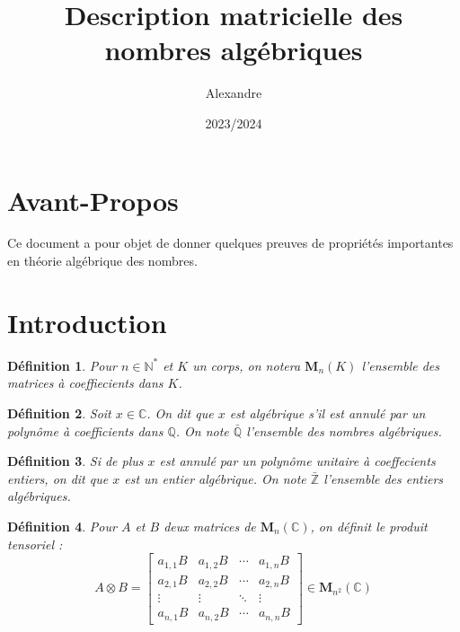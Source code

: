 \documentclass[10pt,a4paper]{article}
\author{Alexandre}
\date{2023/2024}
\title{Description matricielle des nombres algébriques}
\newtheorem{defe}{Définition}[section]
\begin{document}
\maketitle

\section{Avant-Propos}

Ce document a pour objet de donner quelques preuves de propriétés importantes en théorie algébrique des nombres.

\section{Introduction}

\begin{defe}
	Pour $n\in \mathbb{N}^*$ et $K$ un corps, on notera $\mathbf{M}_n(K)$ l'ensemble des matrices à coeffiecients dans $K$.
\end{defe}


\begin{defe}
Soit $x \in \mathbb{C}$. On dit que $x$ est \textit{algébrique} s'il est annulé par un polynôme à coefficients dans $\mathbb{Q}$. 
On note $\bar{\mathbb{Q}}$ l'ensemble des nombres algébriques.
\end{defe}
\begin{defe}
Si de plus $x$ est annulé par un polynôme unitaire à coeffecients entiers, on dit que $x$ est un entier algébrique. 
On note $\bar{\mathbb{Z}}$ l'ensemble des entiers algébriques. 
\end{defe}

\begin{defe}
	Pour $A$ et $B$ deux matrices de $\mathbf{M}_n(\mathbb{C})$, on définit le produit tensoriel :
	$$ 
A \otimes B =\left[\begin{array}{cccc}
a_{1,1} B & a_{1,2} B & \cdots & a_{1,n} B \\
a_{2,1} B & a_{2,2} B & \cdots & a_{2,n} B \\
\vdots & \vdots & \ddots & \vdots \\
a_{n,1} B & a_{n,2} B & \cdots & a_{n,n} B
\end{array}\right] \in \mathbf{M}_{n^2}(\mathbb{C})
$$
	
\end{defe}
\end{document}
